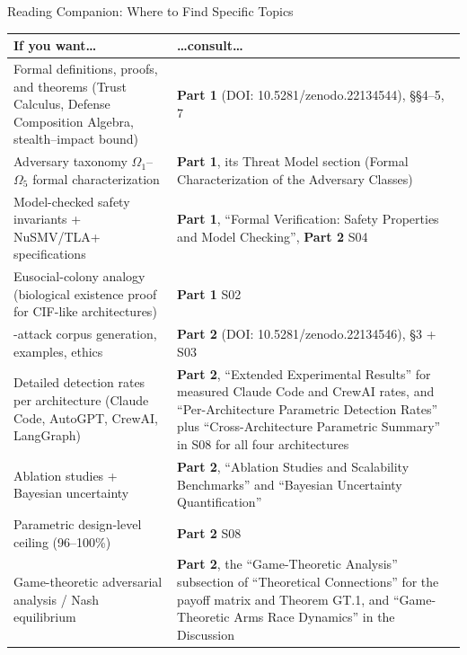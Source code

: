 \documentclass[
  ignorenonframetext,
]{beamer}
\newcounter{none} %
\begin{document}
\begin{frame}{Reading Companion: Where to Find
Specific Topics}
{\def\LTcaptype{none} %
\begin{longtable}[]{@{}
  >{\raggedright\arraybackslash}p{}
  >{\raggedright\arraybackslash}p{}@{}}
\toprule\noalign{}
\begin{minipage}[b]{\linewidth}\raggedright
If you want\ldots{}
\end{minipage} & \begin{minipage}[b]{\linewidth}\raggedright
\ldots consult\ldots{}
\end{minipage} \\
\midrule\noalign{}
\endhead
Formal definitions, proofs, and theorems (Trust Calculus, Defense
Composition Algebra, stealth--impact bound) & \textbf{Part 1} (DOI:
10.5281/zenodo.22134544), §§4--5, 7 \\
Adversary taxonomy \(\Omega_1\)--\(\Omega_5\) formal characterization &
\textbf{Part 1}, its Threat Model section (Formal Characterization of
the Adversary Classes) \\
Model-checked safety invariants + NuSMV/TLA+ specifications &
\textbf{Part 1}, ``Formal Verification: Safety Properties and Model
Checking'', \textbf{Part 2} S04 \\
Eusocial-colony analogy (biological existence proof for CIF-like
architectures) & \textbf{Part 1} S02 \\
950-attack corpus generation, examples, ethics & \textbf{Part 2} (DOI:
10.5281/zenodo.22134546), §3 + S03 \\
Detailed detection rates per architecture (Claude Code, AutoGPT, CrewAI,
LangGraph) & \textbf{Part 2}, ``Extended Experimental Results'' for
measured Claude Code and CrewAI rates, and ``Per-Architecture Parametric
Detection Rates'' plus ``Cross-Architecture Parametric Summary'' in S08
for all four architectures \\
Ablation studies + Bayesian uncertainty & \textbf{Part 2}, ``Ablation
Studies and Scalability Benchmarks'' and ``Bayesian Uncertainty
Quantification'' \\
Parametric design-level ceiling (96--100\%) & \textbf{Part 2} S08 \\
Game-theoretic adversarial analysis / Nash equilibrium & \textbf{Part
2}, the ``Game-Theoretic Analysis'' subsection of ``Theoretical
Connections'' for the payoff matrix and Theorem GT.1, and
``Game-Theoretic Arms Race Dynamics'' in the Discussion \\

\end{longtable}}
\end{frame}
\end{document}
